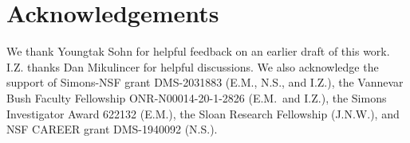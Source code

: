 \documentclass[11pt,reqno]{amsart}
\theoremstyle{plain}
\theoremstyle{definition}
\theoremstyle{remark}
\begin{document}
\section*{Acknowledgements}
We thank Youngtak Sohn for helpful feedback on an earlier draft of this work. I.Z. thanks Dan Mikulincer for helpful discussions. 
We also acknowledge the support of
Simons-NSF grant DMS-2031883 (E.M., N.S., and I.Z.),
the Vannevar Bush Faculty Fellowship ONR-N00014-20-1-2826 (E.M.\ and I.Z.), the Simons Investigator Award 622132 (E.M.),
the Sloan Research Fellowship (J.N.W.),
 and NSF CAREER grant DMS-1940092 (N.S.).

\vfill

{\raggedright

}
\end{document}
